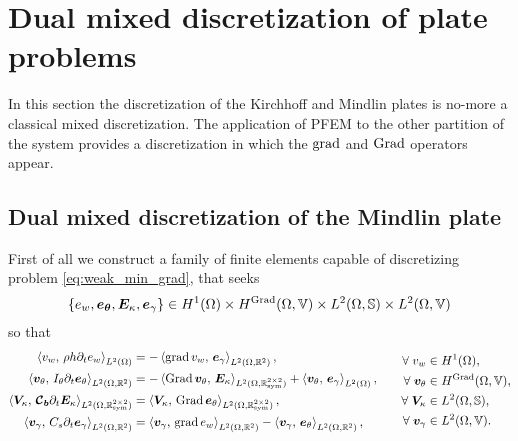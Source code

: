 \section{Dual mixed discretization of plate problems}
In this section the discretization of the Kirchhoff and Mindlin plates is no-more a classical mixed discretization. The application of PFEM to the other partition of the system provides a discretization in which the $\grad$ and $\Grad$ operators appear. 
\subsection{Dual mixed discretization of the Mindlin plate}
First of all we construct a family of finite elements capable of discretizing problem \eqref{eq:weak_min_grad}, that seeks
$$\{e_w, \bm{e}_{\bm{\theta}}, \bm{E}_{\kappa}, \bm{e}_{\gamma}\} \in H^{1}(\Omega) \times H^{\Grad}(\Omega, \mathbb{V}) \times L^2(\Omega, \mathbb{S}) \times L^2(\Omega, \mathbb{V}) $$
so that 
\begin{equation}\label{eq:weak_min_grad_nobd}
\begin{aligned}
\inner[L^2(\Omega)]{v_w}{\rho h \partial_t e_w} &= -\inner[L^2(\Omega, \mathbb{R}^{2})]{\grad v_w}{\bm{e}_\gamma}, \\
\inner[L^2(\Omega, \mathbb{R}^{2})]{\bm{v}_\theta}{I_\theta \partial_t \bm{e}_\theta} &= -\inner[L^2(\Omega, \mathbb{R}^{2\times 2}_{\text{sym}})]{\Grad \bm{v}_\theta}{\bm{E}_\kappa} + \inner[L^2(\Omega)]{\bm{v}_\theta}{\bm{e}_\gamma}, \\
\inner[L^2(\Omega, \mathbb{R}^{2\times 2}_{\text{sym}})]{\bm{V}_\kappa}{\bm{\mathcal{C}_b} \partial_t \bm{E}_\kappa} &= \inner[L^2(\Omega, \mathbb{R}^{2\times 2}_{\text{sym}})]{\bm{V}_\kappa}{\Grad \bm{e}_\theta}, \\
\inner[L^2(\Omega, \mathbb{R}^{2})]{\bm{v}_\gamma}{C_s \partial_t \bm{e}_\gamma} &= \inner[L^2(\Omega, \mathbb{R}^{2})]{\bm{v}_\gamma}{\grad e_w} - \inner[L^2(\Omega, \mathbb{R}^{2})]{\bm{v}_\gamma}{\bm{e}_\theta}, \\
\end{aligned} \qquad
\begin{aligned}
\forall\; v_w &\in H^{1}(\Omega), \\
\forall\; \bm{v}_\theta &\in H^{\Grad}(\Omega, \mathbb{V}), \\
\forall\; \bm{V}_\kappa &\in L^2(\Omega, \mathbb{S}), \\
\forall\; \bm{v}_\gamma &\in L^2(\Omega, \mathbb{V}).
\end{aligned}
\end{equation}

